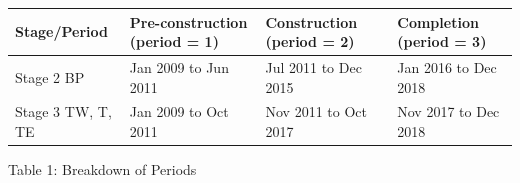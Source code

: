 \documentclass[]{book}
\begin{document}
\begin{longtable}[]{@{}llll@{}}
\toprule
\begin{minipage}[b]{0.17\columnwidth}\raggedright\strut
Stage/Period\strut
\end{minipage} & \begin{minipage}[b]{0.26\columnwidth}\raggedright\strut
Pre-construction (period = 1)\strut
\end{minipage} & \begin{minipage}[b]{0.23\columnwidth}\raggedright\strut
Construction (period = 2)\strut
\end{minipage} & \begin{minipage}[b]{0.22\columnwidth}\raggedright\strut
Completion (period = 3)\strut
\end{minipage}\tabularnewline
\midrule
\endhead
\begin{minipage}[t]{0.17\columnwidth}\raggedright\strut
Stage 2 BP\strut
\end{minipage} & \begin{minipage}[t]{0.26\columnwidth}\raggedright\strut
Jan 2009 to Jun 2011\strut
\end{minipage} & \begin{minipage}[t]{0.23\columnwidth}\raggedright\strut
Jul 2011 to Dec 2015\strut
\end{minipage} & \begin{minipage}[t]{0.22\columnwidth}\raggedright\strut
Jan 2016 to Dec 2018\strut
\end{minipage}\tabularnewline
\begin{minipage}[t]{0.17\columnwidth}\raggedright\strut
Stage 3 TW, T, TE\strut
\end{minipage} & \begin{minipage}[t]{0.26\columnwidth}\raggedright\strut
Jan 2009 to Oct 2011\strut
\end{minipage} & \begin{minipage}[t]{0.23\columnwidth}\raggedright\strut
Nov 2011 to Oct 2017\strut
\end{minipage} & \begin{minipage}[t]{0.22\columnwidth}\raggedright\strut
Nov 2017 to Dec 2018\strut
\end{minipage}\tabularnewline
\bottomrule
\end{longtable}

Table 1: Breakdown of Periods
\end{document}
